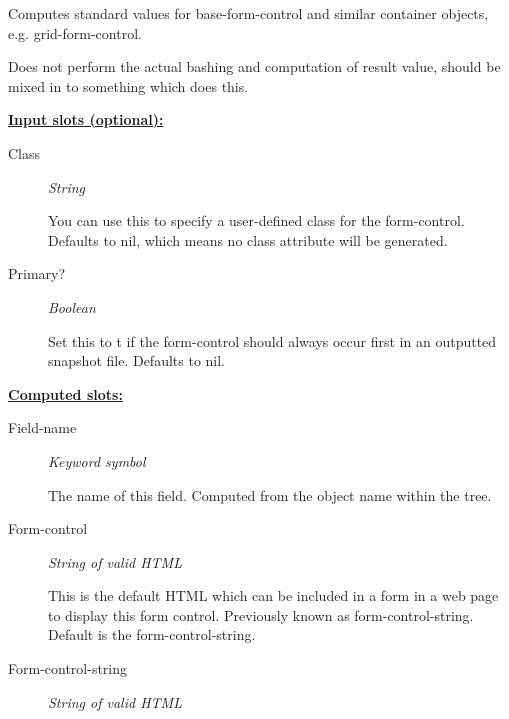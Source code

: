 \documentclass [11pt]{book}
\begin{document}
\begin{itemize}
\begin{description}
Computes standard values for base-form-control and similar container objects, e.g. grid-form-control.

Does not perform the actual bashing and computation of result value, should be mixed in to something which does this.



\end{description}








\textbf{
\underline{Input slots (optional):}}

\begin{description}

\item [Class]
\emph{String}

 You can use this to specify a user-defined class for the form-control. Defaults to nil, which means no class attribute will be generated.




\item [Primary?]
\emph{Boolean}

 Set this to t if the form-control should always occur first in an outputted snapshot file.
Defaults to nil.




\end{description}






\textbf{
\underline{Computed slots:}}

\begin{description}

\item [Field-name]
\emph{Keyword symbol}

 The name of this field. Computed from the object name within the tree.




\item [Form-control]
\emph{String of valid HTML}

 This is the default HTML which can be included in a form in a web page to display this form control.
Previously known as form-control-string. Default is the form-control-string.




\item [Form-control-string]
\emph{String of valid HTML}


\end{description}
\end{itemize}
\end{document}
